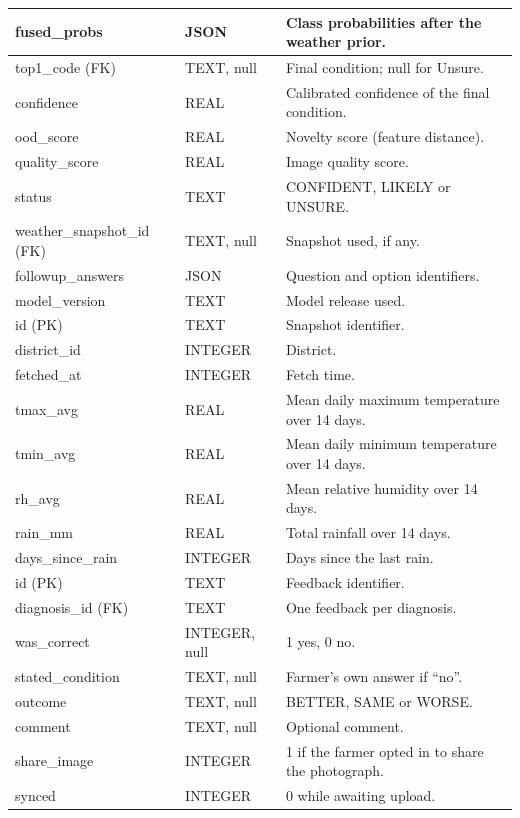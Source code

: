 {\begin{longtable}{|L{4.0cm}|L{2.6cm}|L{8.0cm}|}
fused\_probs & JSON & Class probabilities after the weather prior. \\ \hline
top1\_code (FK) & TEXT, null & Final condition; null for Unsure. \\ \hline
confidence & REAL & Calibrated confidence of the final condition. \\ \hline
ood\_score & REAL & Novelty score (feature distance). \\ \hline
quality\_score & REAL & Image quality score. \\ \hline
status & TEXT & CONFIDENT, LIKELY or UNSURE. \\ \hline
weather\_snapshot\_id (FK) & TEXT, null & Snapshot used, if any. \\ \hline
followup\_answers & JSON & Question and option identifiers. \\ \hline
model\_version & TEXT & Model release used. \\ \hline
{}
id (PK) & TEXT & Snapshot identifier. \\ \hline
district\_id & INTEGER & District. \\ \hline
fetched\_at & INTEGER & Fetch time. \\ \hline
tmax\_avg & REAL & Mean daily maximum temperature over 14 days. \\ \hline
tmin\_avg & REAL & Mean daily minimum temperature over 14 days. \\ \hline
rh\_avg & REAL & Mean relative humidity over 14 days. \\ \hline
rain\_mm & REAL & Total rainfall over 14 days. \\ \hline
days\_since\_rain & INTEGER & Days since the last rain. \\ \hline
{}
id (PK) & TEXT & Feedback identifier. \\ \hline
diagnosis\_id (FK) & TEXT & One feedback per diagnosis. \\ \hline
was\_correct & INTEGER, null & 1 yes, 0 no. \\ \hline
stated\_condition & TEXT, null & Farmer's own answer if ``no''. \\ \hline
outcome & TEXT, null & BETTER, SAME or WORSE. \\ \hline
comment & TEXT, null & Optional comment. \\ \hline
share\_image & INTEGER & 1 if the farmer opted in to share the photograph. \\ \hline
synced & INTEGER & 0 while awaiting upload. \\ \hline

\end{longtable}}
